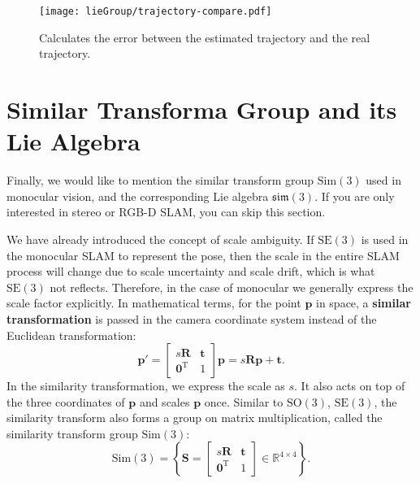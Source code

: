 \begin{figure}[!ht]
    \centering
    \texttt{[image: lieGroup/trajectory-compare.pdf]}
    \caption{Calculates the error between the estimated trajectory and the real trajectory. }
    \label{fig:trajectory-compare}
\end{figure}

\section{Similar Transforma Group and its Lie Algebra}
Finally, we would like to mention the similar transform group $\mathrm{Sim}(3)$ used in monocular vision, and the corresponding Lie algebra $\mathfrak{sim}(3)$. If you are only interested in stereo or RGB-D SLAM, you can skip this section.

We have already introduced the concept of scale ambiguity. If $\mathrm{SE}(3)$ is used in the monocular SLAM to represent the pose, then the scale in the entire SLAM process will change due to scale uncertainty and scale drift, which is what $\mathrm{SE}(3) $ not reflects. Therefore, in the case of monocular we generally express the scale factor explicitly. In mathematical terms, for the point $\mathbf{p}$ in space, a \textbf{similar transformation} is passed in the camera coordinate system instead of the Euclidean transformation:
\begin{equation}
\mathbf{p}' = \left[ {\begin{array}{*{20}{c}}
    {s\mathbf{R}}&\mathbf{t}\\
    {{\mathbf{0}^\mathrm{T}}}&1
    \end{array}} \right] \mathbf{p}
= s\mathbf{R} \mathbf{p} + \mathbf{t}.
\end{equation}
In the similarity transformation, we express the scale as $s$. It also acts on top of the three coordinates of $\mathbf{p}$ and scales $\mathbf{p}$ once. Similar to $\mathrm{SO}(3)$, $\mathrm{SE}(3)$, the similarity transform also forms a group on matrix multiplication, called the similarity transform group $\mathrm{Sim}(3)$:
\begin{equation}
\mathrm{Sim}(3) = \left\{ { \mathbf{S} = \left[ {\begin{array}{*{20}{c}}
        {s\mathbf{R}}& \mathbf{t}\\
        {{\mathbf{0}^\mathrm{T}}}&1
        \end{array}} \right] \in {\mathbb{R}^{4 \times 4}}} \right\}.
\end{equation}

